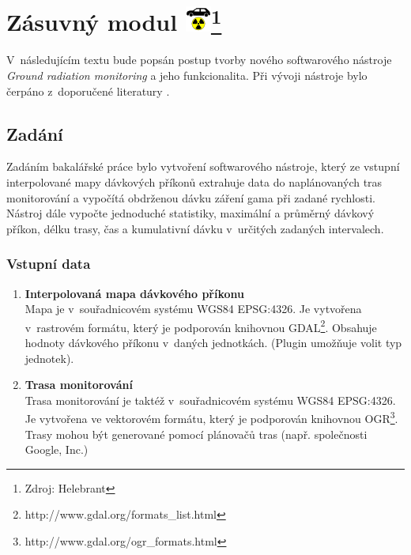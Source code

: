 \chapter[Zásuvný modul]{Zásuvný
modul \includegraphics[scale=0.65]{./pictures/ikonka.png}\footnote{Zdroj:
Helebrant}}
\label{4-plugin}

V~následujícím textu bude popsán postup tvorby nového softwarového
nástroje \textit{Ground radiation monitoring} a jeho
funkcionalita. Při vývoji nástroje bylo čerpáno z~doporučené
literatury \cite{masteringQgis}\cite{diveIntoPython}\cite{rapidPyQt}.

\section{Zadání} Zadáním bakalářské práce bylo vytvoření softwarového
nástroje, který ze vstupní interpolované mapy dávkových příkonů
extrahuje data do naplánovaných tras monitorování a vypočítá obdrženou
dávku záření gama při zadané rychlosti. Nástroj dále vypočte
jednoduché statistiky, maximální a průměrný dávkový příkon, délku
trasy, čas a kumulativní dávku v~určitých zadaných intervalech.

\subsection{Vstupní data}
\label{subsec:vstupniData}
\begin{enumerate}
	\item \textbf{Interpolovaná mapa dávkového příkonu} \\ Mapa je
v~souřadnicovém systému WGS84 EPSG:4326. Je vytvořena v~rastrovém
formátu, který je podporován knihovnou
GDAL\footnote{http://www.gdal.org/formats\_list.html}. Obsahuje
hodnoty dávkového příkonu v~daných jednotkách. (Plugin umožňuje volit
typ jednotek).
	\item \textbf{Trasa monitorování} \\ Trasa monitorování je
taktéž v~souřadnicovém systému WGS84 EPSG:4326. Je vytvořena ve
vektorovém formátu, který je podporován knihovnou
OGR\footnote{http://www.gdal.org/ogr\_formats.html}. Trasy mohou být
generované pomocí plánovačů tras (např. společnosti Google, Inc.)
\end{enumerate}

